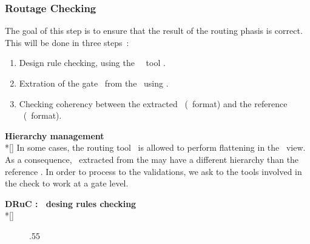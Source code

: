      \subsubsection{Routage Checking}
     \begin{minipage}[t]{\textwidth}
       \forceindent
         The goal of this step is to ensure that the result of the
       routing phasis is correct. This will be done in three steps~:
       \begin{enumerate}
         \item
           Design rule checking, using the \symbolic\ \drc\ tool \druc.
         \item
           Extration of the gate \netlist\ from the \layout\ using \lynx.
         \item
           Checking coherency between the extracted \netlist\ (\fal\ format)
           and the reference \netlist\ (\fvst\ format).
       \end{enumerate}
       \bigskip
     \end{minipage}
     {\bf Hierarchy management}
     \\*[\bigskipamount]
     \nopagebreak
     \indent
       In some cases, the routing tool \dpr\ is allowed to perform flattening
     in the \layout\ view. As a consequence, \netlist\ extracted from the
     \layout may have a different hierarchy than the reference \netlist.
     In order to process to the validations, we ask to the tools involved
     in the check to work at a gate level.
     \\[\bigskipamount]
     \begin{minipage}[t]{\textwidth}
       {\bf DRuC : \symbolic\ desing rules checking}
       \\*[\bigskipamount]
       \forceindent
       \begin{figure}[H]
         \begin{center}
           \leavevmode\epsfxsize.55\textwidth{}
         \end{center}
       \end{figure}
     \end{minipage}
